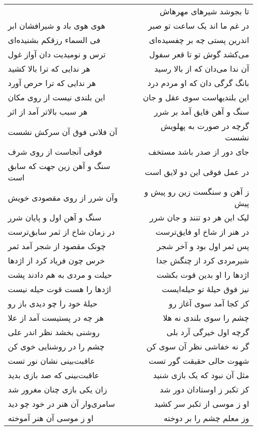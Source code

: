 \begin{center}
\begin{longtable}{l p{0.5cm} r}
&&
تا بجوشد شیرهای مهرهاش
\\
هوی هوی باد و شیرافشان ابر
&&
در غم ما اند یک ساعت تو صبر
\\
فی السماء رزقکم بشنیده‌ای
&&
اندرین پستی چه بر چفسیده‌ای
\\
ترس و نومیدیت دان آواز غول
&&
می‌کشد گوش تو تا قعر سفول
\\
هر ندایی که ترا بالا کشید
&&
آن ندا می‌دان که از بالا رسید
\\
هر ندایی که ترا حرص آورد
&&
بانگ گرگی دان که او مردم درد
\\
این بلندی نیست از روی مکان
&&
این بلندیهاست سوی عقل و جان
\\
هر سبب بالاتر آمد از اثر
&&
سنگ و آهن فایق آمد بر شرر
\\
آن فلانی فوق آن سرکش نشست
&&
گرچه در صورت به پهلویش نشست
\\
فوقی آنجاست از روی شرف
&&
جای دور از صدر باشد مستخف
\\
سنگ و آهن زین جهت که سابق است
&&
در عمل فوقی این دو لایق است
\\
وآن شرر از روی مقصودی خویش
&&
ز آهن و سنگست زین رو پیش و پیش
\\
سنگ و آهن اول و پایان شرر
&&
لیک این هر دو تنند و جان شرر
\\
در زمان شاخ از ثمر سابق‌ترست
&&
در هنر از شاخ او فایق‌ترست
\\
چونک مقصود از شجر آمد ثمر
&&
پس ثمر اول بود و آخر شجر
\\
خرس چون فریاد کرد از اژدها
&&
شیرمردی کرد از چنگش جدا
\\
حیلت و مردی به هم دادند پشت
&&
اژدها را او بدین قوت بکشت
\\
اژدها را هست قوت حیله نیست
&&
نیز فوق حیلهٔ تو حیله‌ایست
\\
حیلهٔ خود را چو دیدی باز رو
&&
کز کجا آمد سوی آغاز رو
\\
هر چه در پستیست آمد از علا
&&
چشم را سوی بلندی نه هلا
\\
روشنی بخشد نظر اندر علی
&&
گرچه اول خیرگی آرد بلی
\\
چشم را در روشنایی خوی کن
&&
گر نه خفاشی نظر آن سوی کن
\\
عاقبت‌بینی نشان نور تست
&&
شهوت حالی حقیقت گور تست
\\
عاقبت‌بینی که صد بازی بدید
&&
مثل آن نبود که یک بازی شنید
\\
زان یکی بازی چنان مغرور شد
&&
کز تکبر ز اوستادان دور شد
\\
سامری‌وار آن هنر در خود چو دید
&&
او ز موسی از تکبر سر کشید
\\
او ز موسی آن هنر آموخته
&&
وز معلم چشم را بر دوخته

\end{longtable}
\end{center}
